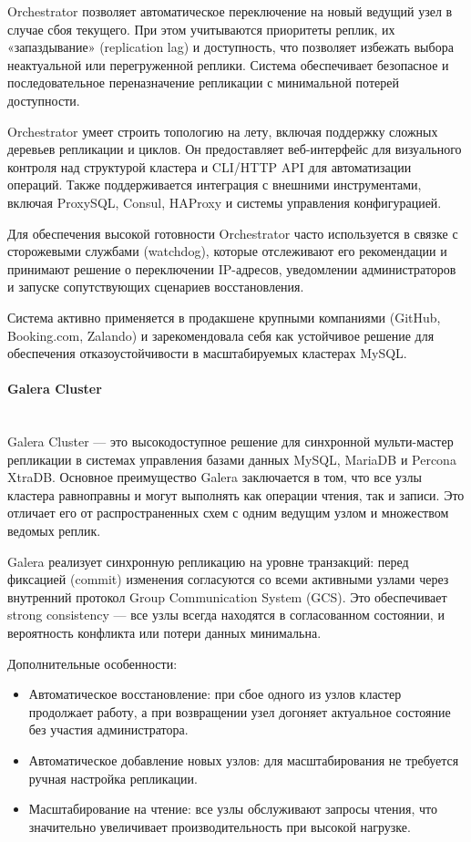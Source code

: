 Orchestrator позволяет автоматическое переключение на новый ведущий узел в случае сбоя текущего. При этом учитываются приоритеты реплик, их «запаздывание» (replication lag) и доступность, что позволяет избежать выбора неактуальной или перегруженной реплики. Система обеспечивает безопасное и последовательное переназначение репликации с минимальной потерей доступности.

Orchestrator умеет строить топологию на лету, включая поддержку сложных деревьев репликации и циклов. Он предоставляет веб-интерфейс для визуального контроля над структурой кластера и CLI/HTTP API для автоматизации операций. Также поддерживается интеграция с внешними инструментами, включая ProxySQL, Consul, HAProxy и системы управления конфигурацией.

Для обеспечения высокой готовности Orchestrator часто используется в связке с сторожевыми службами (watchdog), которые отслеживают его рекомендации и принимают решение о переключении IP-адресов, уведомлении администраторов и запуске сопутствующих сценариев восстановления.

Система активно применяется в продакшене крупными компаниями (GitHub, Booking.com, Zalando) и зарекомендовала себя как устойчивое решение для обеспечения отказоустойчивости в масштабируемых кластерах MySQL.

\paragraph{Galera Cluster} ~\\
Galera Cluster — это высокодоступное решение для синхронной мульти-мастер репликации в системах управления базами данных MySQL, MariaDB и Percona XtraDB. Основное преимущество Galera заключается в том, что все узлы кластера равноправны и могут выполнять как операции чтения, так и записи. Это отличает его от распространенных схем с одним ведущим узлом и множеством ведомых реплик. \autocite{GaleraCl}

Galera реализует синхронную репликацию на уровне транзакций: перед фиксацией (commit) изменения согласуются со всеми активными узлами через внутренний протокол Group Communication System (GCS). Это обеспечивает strong consistency — все узлы всегда находятся в согласованном состоянии, и вероятность конфликта или потери данных минимальна.

Дополнительные особенности:
\begin{itemize}
    \item Автоматическое восстановление: при сбое одного из узлов кластер продолжает работу, а при возвращении узел догоняет актуальное состояние без участия администратора.
    \item Автоматическое добавление новых узлов: для масштабирования не требуется ручная настройка репликации.
    \item Масштабирование на чтение: все узлы обслуживают запросы чтения, что значительно увеличивает производительность при высокой нагрузке.
\end{itemize}

